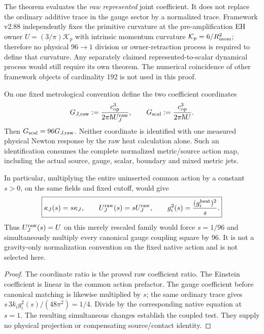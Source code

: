 \documentclass[12pt,a4paper]{article}
\begin{document}
\begin{remark}
\label{p5:rem:g24-raw-eh-owner-firewall}
The theorem evaluates the \emph{raw represented} joint coefficient.  It does
not replace the ordinary additive trace in the gauge sector by a normalized
trace.  Framework v2.88 independently fixes the primitive curvature at the
pre-amplification EH owner \(U=(3/\pi)\mathcal K_p\) with intrinsic momentum curvature \(\mathcal K_p=6/R_{\rm mom}^2\); therefore no physical
\(96\to1\) division or owner-retraction process is required to define that
curvature.  Any separately claimed represented-to-scalar dynamical process
would still require its own theorem.  The numerical coincidence of other
framework objects of cardinality 192 is not used in this proof.
\end{remark}

\begin{proposition}
\label{p5:prop:v2211-raw-newton-coupled-rescaling}
On one fixed metrological convention define the two coefficient coordinates
\[
 G_{J,\rm raw}:=\frac{c_{\rm op}^3}{2\pi\hbar U_J^{\rm raw}},
 \qquad
 G_{\rm scal}:=\frac{c_{\rm op}^3}{2\pi\hbar U}.
\]
Then \(G_{\rm scal}=96G_{J,\rm raw}\).  Neither coordinate is
identified with one measured physical Newton response by the raw heat
calculation alone.  Such an identification consumes the complete normalized
metric/source action map, including the actual source, gauge, scalar,
boundary and mixed metric jets.

In particular, multiplying the entire uninserted common action by a constant
\(s>0\), on the same fields and fixed cutoff, would give
\[
 \boxed{\kappa_J(s)=s\kappa_J,\qquad
 U_J^{\rm raw}(s)=sU_J^{\rm raw},\qquad
 g_i^2(s)=\frac{(g_i^{\rm heat})^2}{s}.}
\]
Thus \(U_J^{\rm raw}(s)=U\) on this merely rescaled family would force
\(s=1/96\) and simultaneously multiply every canonical gauge coupling
square by 96.  It is not a gravity-only normalization convention on the
fixed native action and is not selected here.
\end{proposition}
\begin{proof}
The coordinate ratio is the proved raw coefficient ratio.  The Einstein
coefficient is linear in the common action prefactor.  The gauge coefficient
before canonical matching is likewise multiplied by \(s\); the same
ordinary trace gives
\(s\,3k_ig_i^2(s)/(48\pi^2)=1/4\).
Divide by the corresponding native equation at \(s=1\).
The resulting simultaneous changes establish the coupled test.  They
supply no physical projection or compensating source/contact identity.
\end{proof}
\end{document}
